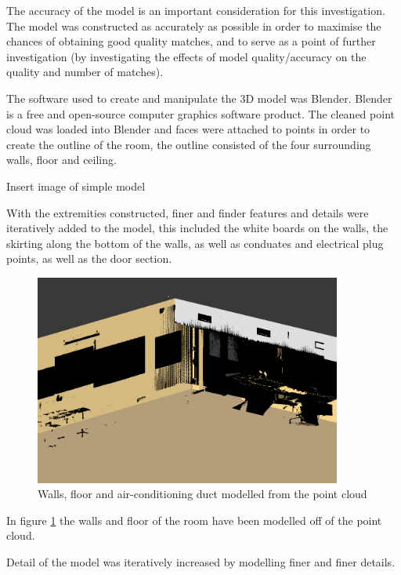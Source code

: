 \documentclass[11pt,a4paper]{report}
\begin{document}
				The accuracy of the model is an important consideration for this investigation. The model was constructed as accurately as possible in order to maximise the chances of obtaining good quality matches, and to serve as a point of further investigation (by investigating the effects of model quality/accuracy on the quality and number of matches).
				
				The software used to create and manipulate the 3D model was Blender. Blender is a free and open-source computer graphics software product. The cleaned point cloud was loaded into Blender and faces were attached to points in order to create the outline of the room, the outline consisted of the four surrounding walls, floor and ceiling. 
				
				{Insert image of simple model}
				
				With the extremities constructed, finer and finder features and details were iteratively added to the model, this included the white boards on the walls, the skirting along the bottom of the walls, as well as conduates and electrical plug points, as well as the door section.
				
				\begin{figure}[H]
					\centering
					\includegraphics[width=0.9\textwidth]{simple_model_with_pc}
					\caption{Walls, floor and air-conditioning duct modelled from the point cloud}
					\label{fig:simple_model}
				\end{figure}
				
				In figure \ref{fig:simple_model} the walls and floor of the room have been modelled off of the point cloud. 
				
				Detail of the model was iteratively increased by modelling finer and finer details.
				
\end{document}
